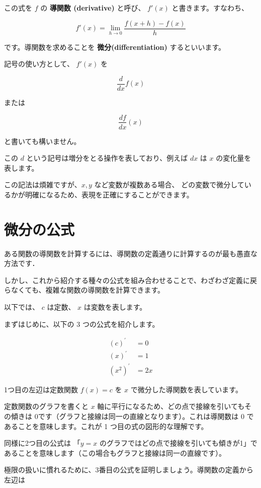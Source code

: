 この式を $f$ の \textbf{導関数 (derivative)} と呼び、 $f'(x)$ と書きます。すなわち、


\[
f'(x)= \lim_{h \rightarrow 0} \frac{f(x + h) - f(x)}{h}
\]


です。導関数を求めることを \textbf{微分(differentiation)} するといいます。

記号の使い方として、 $f'(x)$ を


\[
\frac{d}{dx}f (x)
\]

または

\[
\frac{df}{dx} (x)
\]


と書いても構いません。

この $d$ という記号は増分をとる操作を表しており、例えば $dx$ は $x$ の変化量を表します。

この記法は煩雑ですが、$x, y$ など変数が複数ある場合、 どの変数で微分しているかが明確になるため、表現を正確にすることができます。


\section{微分の公式}


ある関数の導関数を計算するには、導関数の定義通りに計算するのが最も愚直な方法です．

しかし、これから紹介する種々の公式を組み合わせることで、わざわざ定義に戻らなくても、複雑な関数の導関数を計算できます。

以下では、 $c$ は定数、 $x$ は変数を表します。


まずはじめに、以下の 3 つの公式を紹介します。


\begin{align}
\left( c\right)^{'} &= 0 \\
\left( x\right)^{'} &= 1\\
\left( x^{2}\right)^{'} &= 2x
\end{align}


1つ目の左辺は定数関数 $f(x) = c$ を $x$ で微分した導関数を表しています。

定数関数のグラフを書くと $x$ 軸に平行になるため、どの点で接線を引いてもその傾きは $0$です（グラフと接線は同一の直線となります）。これは導関数は 0 であることを意味します。これが 1 つ目の式の図形的な理解です。

同様に2つ目の公式は 「$y=x$ のグラフではどの点で接線を引いても傾きが1」であることを意味します（この場合もグラフと接線は同一の直線です）。

極限の扱いに慣れるために、3番目の公式を証明しましょう。導関数の定義から左辺は


